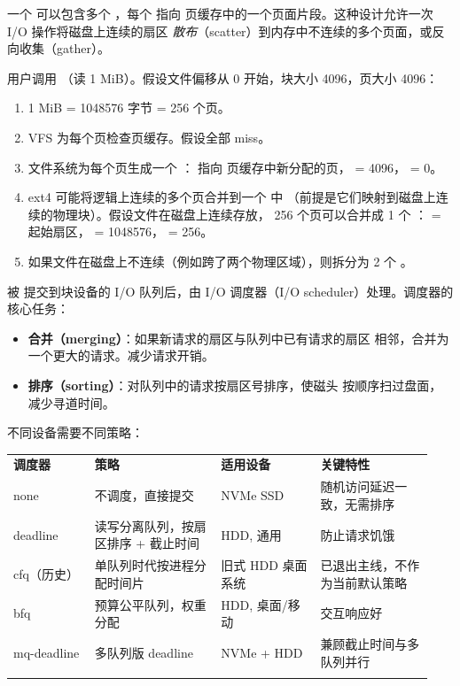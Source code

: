 \begin{filesystemlayout}
一个  可以包含多个 ，每个  指向
页缓存中的一个页面片段。这种设计允许一次 I/O 操作将磁盘上连续的扇区
\emph{散布}（scatter）到内存中不连续的多个页面，或反向收集（gather）。


用户调用 （读 1 MiB）。假设文件偏移从
0 开始，块大小 4096，页大小 4096：

\begin{enumerate}\tightlist
\item 1 MiB = 1048576 字节 = 256 个页。
\item VFS 为每个页检查页缓存。假设全部 miss。
\item 文件系统为每个页生成一个 ： 指向
  页缓存中新分配的页， = 4096， = 0。
\item ext4 可能将逻辑上连续的多个页合并到一个  中
  （前提是它们映射到磁盘上连续的物理块）。假设文件在磁盘上连续存放，
  256 个页可以合并成 1 个 ： = 起始扇区，
   = 1048576， = 256。
\item 如果文件在磁盘上不连续（例如跨了两个物理区域），则拆分为
  2 个 。
\end{enumerate}


 被  提交到块设备的 I/O 队列后，由
I/O 调度器（I/O scheduler）处理。调度器的核心任务：

\begin{itemize}\tightlist
\item \textbf{合并（merging）}：如果新请求的扇区与队列中已有请求的扇区
  相邻，合并为一个更大的请求。减少请求开销。
\item \textbf{排序（sorting）}：对队列中的请求按扇区号排序，使磁头
  按顺序扫过盘面，减少寻道时间。
\end{itemize}

不同设备需要不同策略：

\begin{longtable}{|F{0.18\linewidth}|F{0.29\linewidth}|F{0.22\linewidth}|F{0.25\linewidth}|}
\hline
{}
\textbf{调度器} & \textbf{策略} & \textbf{适用设备} & \textbf{关键特性} \\\tablerowrule
\endhead
none & 不调度，直接提交 & NVMe SSD & 随机访问延迟一致，无需排序 \\\tablerowrule
deadline & 读写分离队列，按扇区排序 + 截止时间 & HDD, 通用 & 防止请求饥饿 \\\tablerowrule
cfq（历史） & 单队列时代按进程分配时间片 & 旧式 HDD 桌面系统 & 已退出主线，不作为当前默认策略 \\\tablerowrule
bfq & 预算公平队列，权重分配 & HDD, 桌面/移动 & 交互响应好 \\\tablerowrule
mq-deadline & 多队列版 deadline & NVMe + HDD & 兼顾截止时间与多队列并行 \\\tablerowrule
\end{longtable}


\end{filesystemlayout}
